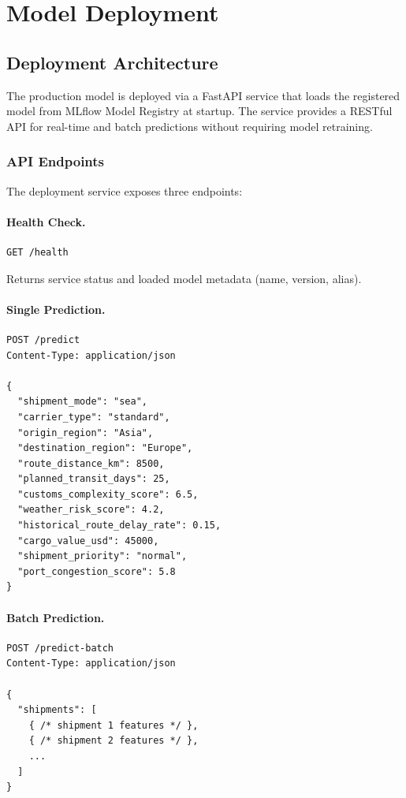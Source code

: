 \documentclass[11pt,a4paper]{article}
\begin{document}
\section{Model Deployment}
\label{sec:deployment}

\subsection{Deployment Architecture}

The production model is deployed via a FastAPI service that loads the registered model from MLflow Model Registry at startup. The service provides a RESTful API for real-time and batch predictions without requiring model retraining.

\subsubsection{API Endpoints}

The deployment service exposes three endpoints:

\paragraph{Health Check.}
\begin{lstlisting}[style=shell]
GET /health
\end{lstlisting}
Returns service status and loaded model metadata (name, version, alias).

\paragraph{Single Prediction.}
\begin{lstlisting}[style=shell]
POST /predict
Content-Type: application/json

{
  "shipment_mode": "sea",
  "carrier_type": "standard",
  "origin_region": "Asia",
  "destination_region": "Europe",
  "route_distance_km": 8500,
  "planned_transit_days": 25,
  "customs_complexity_score": 6.5,
  "weather_risk_score": 4.2,
  "historical_route_delay_rate": 0.15,
  "cargo_value_usd": 45000,
  "shipment_priority": "normal",
  "port_congestion_score": 5.8
}
\end{lstlisting}

\paragraph{Batch Prediction.}
\begin{lstlisting}[style=shell]
POST /predict-batch
Content-Type: application/json

{
  "shipments": [
    { /* shipment 1 features */ },
    { /* shipment 2 features */ },
    ...
  ]
}
\end{lstlisting}
\end{document}
